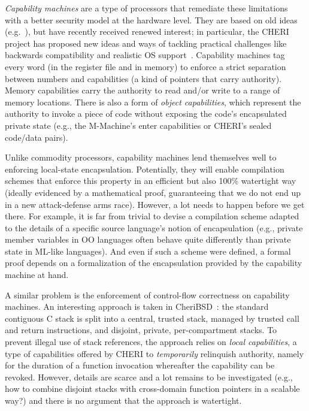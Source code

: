 \documentclass[acmsmall,review]{acmart}\settopmatter{printfolios=true}
\begin{document}
\emph{Capability machines} are a type of processors that
remediate these limitations with a better security model at
the hardware level. They are based on old ideas
(e.g.~\citet{Carter:1994:HSF:195473.195579,Dennis:1966:PSM:365230.365252,shapiro_eros:_1999}),
but have recently received renewed interest; in particular, the CHERI
project has proposed new ideas and ways of tackling practical
challenges like backwards compatibility and realistic OS
support~\citep{Watson2015Cheri,Woodruff:2014:CCM:2665671.2665740}. Capability
machines tag every word (in the register file and in memory) to
enforce a strict separation between numbers and capabilities (a kind
of pointers that carry authority). Memory capabilities carry
the authority to read and/or write to a range of memory
locations. There is also a form of \emph{object capabilities}, which represent the
authority to invoke a piece of code without exposing the code's
encapsulated private state (e.g., the M-Machine's enter capabilities or
CHERI's sealed code/data pairs).

Unlike commodity processors, capability machines lend themselves well to
enforcing local-state encapsulation. Potentially, they will enable compilation
schemes that enforce this property in an efficient but also 100\% watertight way
(ideally evidenced by a mathematical proof, guaranteeing that we do not end up
in a new attack-defense arms race). However, a lot needs to happen before we get
there. For example, it is far from trivial to devise a compilation scheme
adapted to the details of a specific source language's notion of encapsulation
(e.g., private member variables in OO languages often behave quite differently
than private state in ML-like languages). And even if such a scheme were
defined, a formal proof depends on a formalization of the encapsulation provided
by the capability machine at hand.

A similar problem is the enforcement of control-flow correctness on capability
machines. An interesting approach is taken in CheriBSD~\citep{Watson2015Cheri}:
the standard contiguous C stack is split into a central, trusted stack, managed
by trusted call and return instructions, and disjoint, private, per-compartment
stacks. To prevent illegal use of stack references, the approach relies on
\emph{local capabilities}, a type of capabilities offered by CHERI to
\emph{temporarily} relinquish authority, namely for the duration of a function
invocation whereafter the capability can be revoked. However, details are scarce
and a lot remains to be investigated (e.g., how to combine disjoint stacks with
cross-domain function pointers in a scalable way?) and there is no argument that
the approach is watertight.
\end{document}
